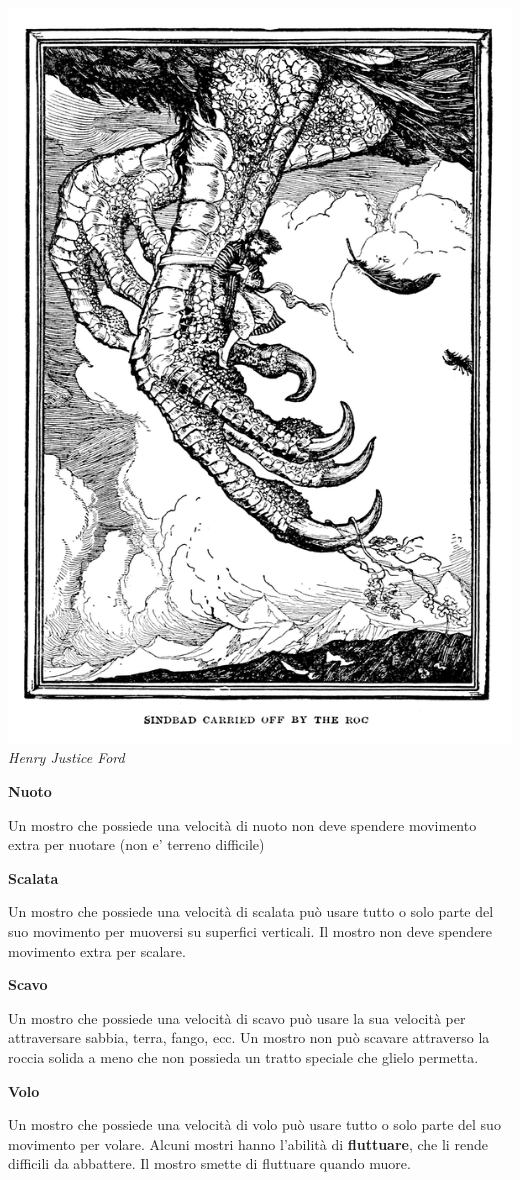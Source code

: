 \begin{multicols}{2}
\begin{center}
	\includegraphics[width=0.7\linewidth]{immagini/roc.png}\\
	\textit{Henry Justice Ford}
\end{center}


\medskip\textbf{Nuoto}

Un mostro che possiede una velocità di nuoto non deve spendere movimento extra per nuotare (non e' terreno difficile)

\medskip\textbf{Scalata}

Un mostro che possiede una velocità di scalata può usare tutto o solo parte del suo movimento per muoversi su superfici verticali. Il mostro non deve spendere movimento extra per scalare.

\medskip\textbf{Scavo}

Un mostro che possiede una velocità di scavo può usare la sua velocità per attraversare sabbia, terra, fango, ecc. Un mostro non può scavare attraverso la roccia solida a meno che non possieda un tratto speciale che glielo permetta.

\medskip\textbf{Volo}

Un mostro che possiede una velocità di volo può usare tutto o solo parte del suo movimento per volare. Alcuni mostri hanno l'abilità di \textbf{fluttuare}, che li rende difficili da abbattere. Il mostro smette di fluttuare quando muore.



\end{multicols}
